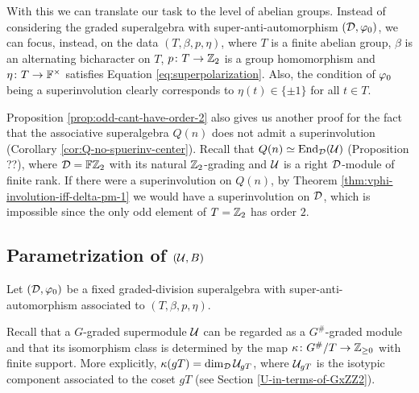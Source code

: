 With this we can translate our task to the level of abelian groups. 
Instead of considering the graded superalgebra with super-anti-automorphism $(\mathcal{D}, \varphi_0)$, we can focus, instead, on the data $(T, \beta, p, \eta)$, where $T$ is a finite abelian group, $\beta$ is an alternating bicharacter on $T$, $p\colon T \to \mathbb{Z}_2$ is a group homomorphism and $\eta\colon T \to \mathbb{F}^\times$ satisfies Equation \eqref{eq:superpolarization}. 
Also, the condition of $\varphi_0$ being a superinvolution clearly corresponds to $\eta(t) \in \{ \pm 1 \}$ for all $t\in T$.



\begin{remark}
    Proposition \ref{prop:odd-cant-have-order-2} also gives us another proof for the fact that the associative superalgebra $Q(n)$ does not admit a superinvolution (Corollary \ref{cor:Q-no-spuerinv-center}). 
    Recall that $Q(n) \simeq \operatorname{End}_{\mathcal{D}} (\mathcal U)$ (Proposition ??), where $\mathcal{D}= \mathbb{F}\mathbb{Z}_2$ with its natural $\mathbb{Z}_2$-grading and $\mathcal U$ is a right $\mathcal{D}$-module of finite rank. 
    If there were a superinvolution on $Q(n)$, by Theorem \ref{thm:vphi-involution-iff-delta-pm-1} we would have a superinvolution on $\mathcal{D}$, which is impossible since the only odd element of $T = \mathbb{Z}_2$ has order $2$. 
\end{remark}


\subsection{Parametrization of $(\mathcal U, B)$}


Let $(\mathcal{D}, \varphi_0)$ be a fixed graded-division superalgebra with super-anti-automorphism associated to $(T, \beta, p, \eta)$. 


Recall that a $G$-graded supermodule $\mathcal U$ can be regarded as a $G^\#$-graded module 
and that its isomorphism class is determined by the map $\kappa\colon G^\#/T \to \mathbb{Z}_{\geq 0}$ with finite support. 
More explicitly, $\kappa (gT) = \dim_{\mathcal{D}} \mathcal U_{gT}$, where $\mathcal U_{gT}$ is the isotypic component associated to the coset $gT$ (see Section \ref{U-in-terms-of-GxZZ2}).

